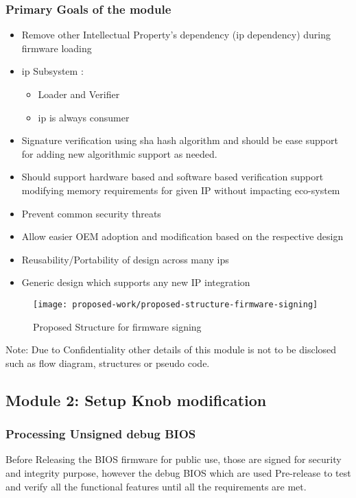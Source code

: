 \subsubsection{Primary Goals of the module}
\begin{itemize}
	\item Remove other Intellectual Property's dependency (\gls{ip} dependency) during firmware loading
	\item \gls{ip} Subsystem :
	\begin{itemize}
		\item Loader and Verifier
		\item \gls{ip} is always consumer
	\end{itemize}
	\item Signature verification using \gls{sha} hash algorithm and should be ease support for adding new algorithmic support as needed.
	\item Should support hardware based and software based verification support
	modifying memory requirements for given IP without impacting eco-system
	\item Prevent common security threats
	\item Allow easier OEM adoption and modification based on the respective design
	\item Reusability/Portability of design across many \gls{ip}s
	\item Generic design which supports any new IP integration
\end{itemize}

\begin{figure}[!htbp]
	\centering
	\texttt{[image: proposed-work/proposed-structure-firmware-signing]}
	\caption{Proposed Structure for firmware signing}\label{fig:proposed-work-proposed-structure-firmware-signing}
\end{figure}

Note: Due to Confidentiality other details of this module is not to be disclosed such as flow diagram, structures or pseudo code.

\subsection{Module 2: Setup Knob modification}\label{module-setup-knob-modification}

\subsubsection{Processing Unsigned debug BIOS}\label{subsection-processing-bios}
Before Releasing the BIOS firmware for public use, those are signed for security and integrity purpose, however the debug BIOS which are used Pre-release to test and verify all the functional features until all the requirements are met.


